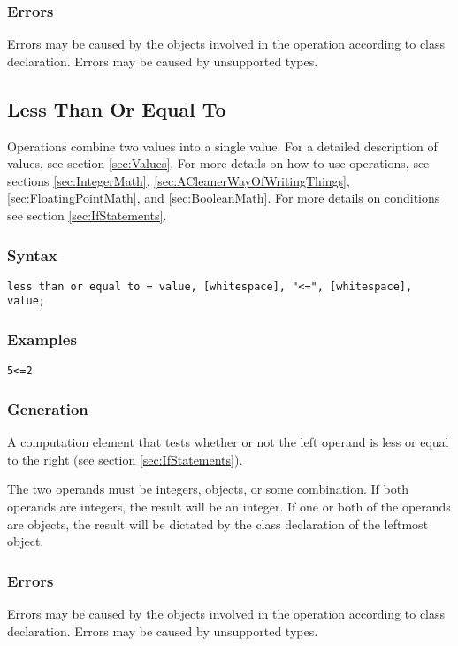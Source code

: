 \documentclass[10pt,a4paper]{article}
\begin{document}
\subsubsection{Errors}
Errors may be caused by the objects involved in the operation according to class declaration. Errors may be caused by unsupported types.

\newpage




\subsection{Less Than Or Equal To}
Operations combine two values into a single value. For a detailed description of values, see section \ref{sec:Values}. For more details on how to use operations, see sections \ref{sec:IntegerMath}, \ref{sec:ACleanerWayOfWritingThings}, \ref{sec:FloatingPointMath}, and \ref{sec:BooleanMath}. For more details on conditions see section \ref{sec:IfStatements}.

\subsubsection{Syntax}
\begin{verbatim}
less than or equal to = value, [whitespace], "<=", [whitespace], value;
\end{verbatim}

\subsubsection{Examples}
\begin{verbatim}
5<=2
\end{verbatim}

\subsubsection{Generation}
A computation element that tests whether or not the left operand is less or equal to the right (see section \ref{sec:IfStatements}).

The two operands must be integers, objects, or some combination. If both operands are integers, the result will be an integer. If one or both of the operands are objects, the result will be dictated by the class declaration of the leftmost object.

\subsubsection{Errors}
Errors may be caused by the objects involved in the operation according to class declaration. Errors may be caused by unsupported types.
\end{document}
